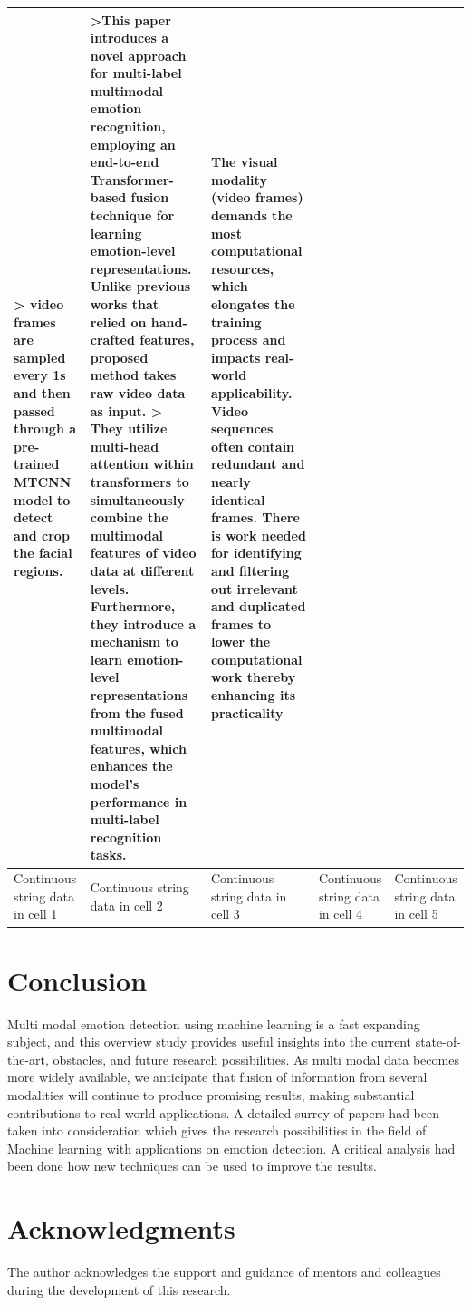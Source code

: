 \documentclass[conference]{IEEEtran}
\begin{document}
\begin{longtable}
\begin{tabularx}{\textwidth}{|>{\raggedright\arraybackslash}X|>{\raggedright\arraybackslash}X|>{\raggedright\arraybackslash}X|>{\raggedright\arraybackslash}X|>{\raggedright\arraybackslash}X|}
> video frames are sampled every 1s and then passed through a pre-trained MTCNN model to detect and crop the facial regions. &>This paper introduces a novel approach for multi-label multimodal emotion recognition, employing an end-to-end Transformer-based fusion technique for learning emotion-level representations. Unlike previous works that relied on hand-crafted features, proposed method takes raw video data as input. > They utilize multi-head attention within transformers to simultaneously combine the multimodal features of video data at different levels. Furthermore, they introduce a mechanism to learn emotion-level representations from the fused multimodal features, which enhances the model's performance in multi-label recognition tasks. & The visual modality (video frames) demands the most computational resources, which elongates the training process and impacts real-world applicability. Video sequences often contain redundant and nearly identical frames. There is work needed   for identifying and filtering out irrelevant and duplicated frames to lower the computational work thereby enhancing its practicality  \\
\hline
Continuous string data in cell 1 & Continuous string data in cell 2 & Continuous string data in cell 3 & Continuous string data in cell 4 & Continuous string data in cell 5 \\
\end{tabularx}
\end{longtable}
\newpage
\clearpage

\newpage
\section{Conclusion}

Multi modal emotion detection using machine learning is a fast expanding subject, and this overview study provides useful insights into the current state-of-the-art, obstacles, and future research possibilities. As multi modal data becomes more widely available, we anticipate that fusion of information from several modalities will continue to produce promising results, making substantial contributions to real-world applications. A detailed surrey of papers had been taken into consideration which gives the research possibilities in the field of Machine learning with applications on emotion detection. A critical analysis had been done how new techniques can be used to improve the results. 

\section*{Acknowledgments}
The author acknowledges the support and guidance of mentors and colleagues during the development of this research.



\end{document}
